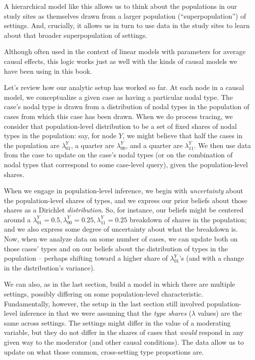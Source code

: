 \documentclass[
  12pt,
]{book}
\begin{document}
A hierarchical model like this allows us to think about the populations in our study sites as themselves drawn from a larger population (``superpopulation'') of settings. And, crucially, it allows us in turn to use data in the study sites to learn about that broader superpopulation of settings.

Although often used in the context of linear models with parameters for average causal effects, this logic works just as well with the kinds of causal models we have been using in this book.

Let's review how our analytic setup has worked so far. At each node in a causal model, we conceptualize a given case as having a particular nodal type. The case's nodal type is drawn from a distribution of nodal types in the population of cases from which this case has been drawn. When we do process tracing, we consider that population-level distribution to be a set of fixed shares of nodal types in the population: say, for node \(Y\), we might believe that half the cases in the population are \(\lambda^Y_{01}\), a quarter are \(\lambda^Y_{00}\), and a quarter are \(\lambda^Y_{11}\). We then use data from the case to update on the case's nodal types (or on the combination of nodal types that correspond to some case-level query), given the population-level shares.

When we engage in population-level inference, we begin with \emph{uncertainty} about the population-level shares of types, and we express our prior beliefs about those shares as a Dirichlet \emph{distribution}. So, for instance, our beliefs might be centered around a \(\lambda^Y_{01}=0.5, \lambda^Y_{00}=0.25, \lambda^Y_{11}=0.25\) breakdown of shares in the population; and we also express some degree of uncertainty about what the breakdown is. Now, when we analyze data on some number of cases, we can update both on those cases' types and on our beliefs about the distribution of types in the population -- perhaps shifting toward a higher share of \(\lambda^Y_{01}\)'s (and with a change in the distribution's variance).

We can also, as in the last section, build a model in which there are multiple settings, possibly differing on some population-level characteristic. Fundamentally, however, the setup in the last section still involved population-level inference in that we were assuming that the \emph{type shares} (\(\lambda\) values) are the same across settings. The settings might differ in the value of a moderating variable, but they do not differ in the shares of cases that \emph{would} respond in any given way to the moderator (and other causal conditions). The data allow us to update on what those common, cross-setting type proportions are.
\end{document}
